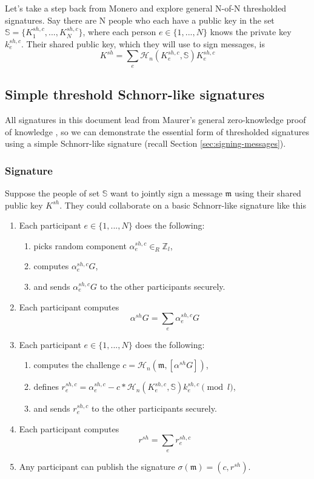 Let's take a step back from Monero and explore general N-of-N thresholded signatures. Say there are N people who each have a public key in the set $\mathbb{S} = \{K^{sh,c}_1,...,K^{sh,c}_N\}$, where each person $e \in \{1,...,N\}$ knows the private key $k^{sh,c}_e$. Their shared public key, which they will use to sign messages, is
\[ K^{sh} = \sum_e \mathcal{H}_n(K^{sh,c}_e,\mathbb{S})K^{sh,c}_e \]

\subsection{Simple threshold Schnorr-like signatures}
\label{sec:simple-threshold-schnorr}

All signatures in this document lead from Maurer's general zero-knowledge proof of knowledge \cite{simple-zk-proof-maurer}, so we can demonstrate the essential form of thresholded signatures using a simple Schnorr-like signature (recall Section \ref{sec:signing-messages}).

\subsubsection*{Signature}

Suppose the people of set $\mathbb{S}$ want to jointly sign a message $\mathfrak{m}$ using their shared public key $K^{sh}$. They could collaborate on a basic Schnorr-like signature like this

\begin{enumerate}
    \item Each participant $e \in \{1,...,N\}$ does the following:
    \begin{enumerate}
        \item picks random component $\alpha^{sh,c}_e \in_R \mathbb{Z}_l$,
        \item computes $\alpha^{sh,c}_e G$,
        \item and sends $\alpha^{sh,c}_e G$ to the other participants securely.
    \end{enumerate}
    \item Each participant computes 
    \[ \alpha^{sh} G = \sum_e \alpha^{sh,c}_e G \]
    \item Each participant $e \in \{1,...,N\}$ does the following:
    \begin{enumerate}
        \item computes the challenge $c = \mathcal{H}_n(\mathfrak{m},[\alpha^{sh} G])$,
        \item defines $r^{sh,c}_e = \alpha^{sh,c}_e - c*\mathcal{H}_n(K^{sh,c}_e,\mathbb{S}) k^{sh,c}_e \pmod l$,
        \item and sends $r^{sh,c}_e$ to the other participants securely.
    \end{enumerate}
    \item Each participant computes 
    \[ r^{sh} = \sum_e r^{sh,c}_e\]
    \item Any participant can publish the signature $\sigma(\mathfrak{m}) = (c,r^{sh})$.
\end{enumerate}

